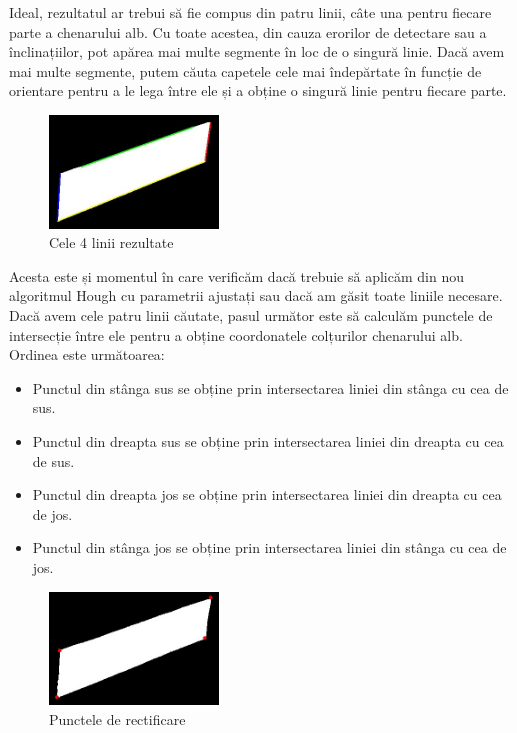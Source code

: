 \documentclass[a4paper,12pt]{report}
\begin{document}
Ideal, rezultatul ar trebui să fie compus din patru linii, câte una pentru fiecare parte a chenarului alb. Cu toate acestea, din cauza erorilor de detectare sau a înclinațiilor, pot apărea mai multe segmente în loc de o singură linie. Dacă avem mai multe segmente, putem căuta capetele cele mai îndepărtate în funcție de orientare pentru a le lega între ele și a obține o singură linie pentru fiecare parte.

\begin{figure}[h!]
    \centering
    \includegraphics[width=0.4\textwidth]{images/sorted_lines.jpg}
    \caption{Cele 4 linii rezultate}
\end{figure}
\FloatBarrier

Acesta este și momentul în care verificăm dacă trebuie să aplicăm din nou algoritmul Hough cu parametrii ajustați sau dacă am găsit toate liniile necesare. Dacă avem cele patru linii căutate, pasul următor este să calculăm punctele de intersecție între ele pentru a obține coordonatele colțurilor chenarului alb. Ordinea este următoarea:
\begin{itemize}
    \item Punctul din stânga sus se obține prin intersectarea liniei din stânga cu cea de sus.
    \item Punctul din dreapta sus se obține prin intersectarea liniei din dreapta cu cea de sus.
    \item Punctul din dreapta jos se obține prin intersectarea liniei din dreapta cu cea de jos.
    \item Punctul din stânga jos se obține prin intersectarea liniei din stânga cu cea de jos.
\end{itemize}

\begin{figure}[h!]
    \centering
    \includegraphics[width=0.4\textwidth]{images/points.jpg}
    \caption{Punctele de rectificare}
\end{figure}
\FloatBarrier
\end{document}

